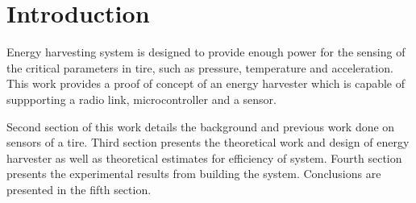 \section{Introduction}

\thispagestyle{empty}


Energy harvesting system is designed to provide enough power for the sensing of the critical parameters in tire, such as pressure, temperature and acceleration. This work provides a proof of concept of an energy harvester which is capable of suppporting a radio link, microcontroller and a sensor. 

Second section of this work details the background and previous work done on sensors of a tire. Third section presents the theoretical work and design of energy harvester as well as theoretical estimates for efficiency of system. Fourth section presents the experimental results from building the system. Conclusions are presented in the fifth section.




